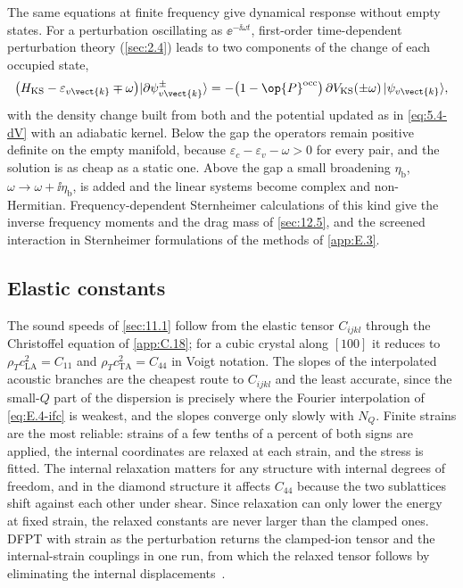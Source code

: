 The same equations at finite frequency give dynamical response without empty states. For a perturbation oscillating as $\ee^{-\ii\omega t}$, first-order time-dependent perturbation theory (\cref{sec:2.4}) leads to two components of the change of each occupied state,
\begin{equation}
  \bigl(H_{\mathrm{KS}} - \varepsilon_{v\vect{k}} \mp \omega\bigr)|\partial\psi^{\pm}_{v\vect{k}}\rangle = -\bigl(1 - \op{P}^{\mathrm{occ}}\bigr)\,\partial V_{\mathrm{KS}}(\pm\omega)\,|\psi_{v\vect{k}}\rangle ,
  \label{eq:E.4-sthw}
\end{equation}
with the density change built from both and the potential updated as in \cref{eq:5.4-dV} with an adiabatic kernel. Below the gap the operators remain positive definite on the empty manifold, because $\varepsilon_c - \varepsilon_v - \omega > 0$ for every pair, and the solution is as cheap as a static one. Above the gap a small broadening $\eta_{\mathrm{b}}$, $\omega \to \omega + \ii\eta_{\mathrm{b}}$, is added and the linear systems become complex and non-Hermitian. Frequency-dependent Sternheimer calculations of this kind give the inverse frequency moments and the drag mass of \cref{sec:12.5}, and the screened interaction in Sternheimer formulations of the methods of \cref{app:E.3}.

\subsection{Elastic constants}

The sound speeds of \cref{sec:11.1} follow from the elastic tensor $C_{ijkl}$ through the Christoffel equation of \cref{app:C.18}; for a cubic crystal along $[100]$ it reduces to $\rho_T c_{\mathrm{LA}}^2 = C_{11}$ and $\rho_T c_{\mathrm{TA}}^2 = C_{44}$ in Voigt notation. The slopes of the interpolated acoustic branches are the cheapest route to $C_{ijkl}$ and the least accurate, since the small-$Q$ part of the dispersion is precisely where the Fourier interpolation of \cref{eq:E.4-ifc} is weakest, and the slopes converge only slowly with $N_Q$. Finite strains are the most reliable: strains of a few tenths of a percent of both signs are applied, the internal coordinates are relaxed at each strain, and the stress is fitted. The internal relaxation matters for any structure with internal degrees of freedom, and in the diamond structure it affects $C_{44}$ because the two sublattices shift against each other under shear. Since relaxation can only lower the energy at fixed strain, the relaxed constants are never larger than the clamped ones. DFPT with strain as the perturbation returns the clamped-ion tensor and the internal-strain couplings in one run, from which the relaxed tensor follows by eliminating the internal displacements~\cite[Sect.~II.E.1]{baroni2001phonons}.

